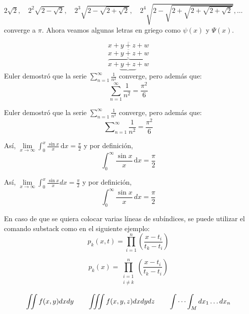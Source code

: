 \documentclass{article}
\begin{document}
$2\sqrt{2},\quad 2^2\sqrt{2-\sqrt{2}},\quad 2^3\sqrt{2-\sqrt{2+\sqrt{2}}},
\quad 2^4\sqrt{2-\sqrt{2+\sqrt{2+\sqrt{2+\sqrt{2}}}}},\ldots
$
converge a $\pi$. Ahora veamos algunas letras en griego como
$\psi(x)$ y $\Psi(x)$.

\begin{equation}
\overline{x+y+z+w}
\end{equation}
\begin{equation}
\overline{x+\underline{y+z}+w}
\end{equation}
\begin{equation}
\overbrace{x+\underbrace{y+z}+w}
\end{equation}
Euler demostró que la serie
$\sum_{n=1}^\infty\frac{1}{n^2}$
converge, pero además que:
\begin{equation}
\sum_{n=1}^\infty\frac{1}{n^2}=\frac{\pi^2}{6}
\end{equation}

Euler demostró que la serie $\sum\limits_{n=1}^\infty\frac{1}{n^2}$
converge, pero además que:
\begin{equation}
\sum\nolimits_{n=1}^\infty\frac{1}{n^2}=\frac{\pi^2}{6}
\end{equation}

Así, $\lim\limits_{x\to\infty}\int_0^x\frac{\sin x}{x}\,\mathrm{d}x
=\frac{\pi}{2}$ y por definición,
\begin{equation}
\int_0^\infty\frac{\sin x}{x}\,\mathrm{d}x=\frac{\pi}{2}
\end{equation}

Así, $\lim\limits_{x\to\infty}\int_0^x\frac{\sin x}{x}dx
=\frac{\pi}{2}$ y por definición,
\begin{equation}
\int_0^\infty\frac{\sin x}{x}\,dx=\frac{\pi}{2}
\end{equation}

En caso de que se quiera colocar varias líneas de subíndices, se puede utilizar el comando substack como en el siguiente ejemplo:
\begin{equation}
p_k(x,t)=\prod_{i=1}^{n}
\left(\frac{x-t_i}{t_k-t_i}\right)
\end{equation}

\begin{equation}
p_k(x)=\prod_{\substack{i=1\\i\ne k}}^n
\left(\frac{x-t_i}{t_k-t_i}\right)
\end{equation}

\begin{equation}
\iint f(x,y) dxdy \qquad \iiint f(x,y,z) dxdydz \qquad
\idotsint_M dx_1\dots dx_n 
\end{equation}
\end{document}
